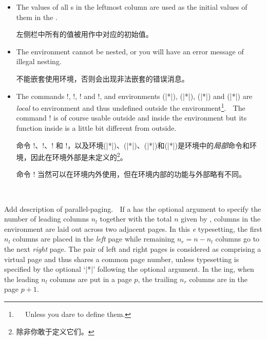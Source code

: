 \begin{description}
\begin{itemize}
\item
The values of all \lcounter{}s in the leftmost column are used as the
initial values of them in the \postenv.

左侧栏中所有\lcounter{}的值被用作\postenv{}中对应\lcounter{}的初始值。
\item
The  environment cannot be nested, or you will have an error
message of illegal nesting.

不能嵌套使用环境，否则会出现非法嵌套的错误消息。 
\item
The commands \!\switchcolumn!, \!\synccounter!, \!\syncallcounters! and
\!\flushpage!, and environments (|*|), (|*|),
(|*|) and (|*|) are {\em local} to
 environment and thus undefined outside the
environment\footnote{

Unless you dare to define them.}.

The command \!\clearpage! is of course usable outside and inside the
environment but its function inside is a little bit different from outside.

命令 \!\switchcolumn!、\!\synccounter!、\!\syncallcounters! 和 \!\flushpage!，以及环境(|*|)、(|*|)、(|*|)和(|*|)是环境中的{\em 局部}命令和环境，因此在环境外部是未定义的\footnote{除非你敢于定义它们。}。

命令 \!\clearpage! 当然可以在环境内外使用，但在环境内部的功能与外部略有不同。
\end{itemize}



\item[\ENV{paracol}{\oarg{numleft}\marg{num}\oarg{text}}]\mbox{}

\mbox{}\par
{}
{Add description of parallel-paging.}

If a \beginparacol{} has the optional  argument to specify
the number of leading columns $n_l$ together with the total $n$ given by
, columns in the environment are laid out across two adjacent
pages.  In this {\em\Uidx\parapag{}e} typesetting, the first $n_l$ columns
are placed in the {\em left} page while remaining $n_r=n-n_l$ columns go to
the next {\em right} page.  The pair of left and right pages is
considered as comprising a virtual {\em\Uidx\paired} page and thus shares
a common page number, unless {\em\Uidx\npaired} typesetting is specified
by the optional `|*|' following the optional  argument.  In
the \npaired{} \parapag{}ing, when the leading $n_l$ columns are put in a
page $p$, the trailing $n_r$ columns are in the page $p+1$.


\end{description}
